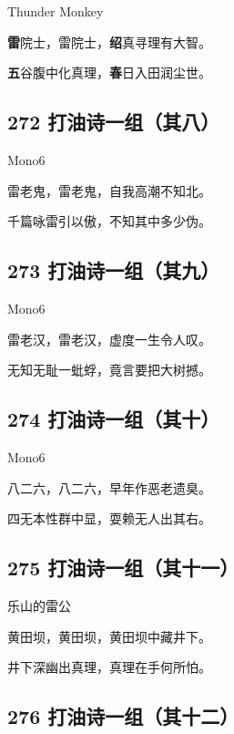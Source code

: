 {Thunder Monkey}

\textbf{雷}院士，雷院士，\textbf{绍}真寻理有大智。

\textbf{五}谷腹中化真理，\textbf{春}日入田润尘世。

\hypertarget{ux6253ux6cb9ux8bd7ux4e00ux7ec4ux5176ux516b}{%
\subsection{272
打油诗一组（其八）}\label{ux6253ux6cb9ux8bd7ux4e00ux7ec4ux5176ux516b}}

{Mono6}

雷老鬼，雷老鬼，自我高潮不知北。

千篇咏雷引以傲，不知其中多少伪。

\hypertarget{ux6253ux6cb9ux8bd7ux4e00ux7ec4ux5176ux4e5d}{%
\subsection{273
打油诗一组（其九）}\label{ux6253ux6cb9ux8bd7ux4e00ux7ec4ux5176ux4e5d}}

{Mono6}

雷老汉，雷老汉，虚度一生令人叹。

无知无耻一蚍蜉，竟言要把大树撼。

\hypertarget{ux6253ux6cb9ux8bd7ux4e00ux7ec4ux5176ux5341}{%
\subsection{274
打油诗一组（其十）}\label{ux6253ux6cb9ux8bd7ux4e00ux7ec4ux5176ux5341}}

{Mono6}

八二六，八二六，早年作恶老遗臭。

四无本性群中显，耍赖无人出其右。

\hypertarget{ux6253ux6cb9ux8bd7ux4e00ux7ec4ux5176ux5341ux4e00}{%
\subsection{275
打油诗一组（其十一）}\label{ux6253ux6cb9ux8bd7ux4e00ux7ec4ux5176ux5341ux4e00}}

{乐山的雷公}

黄田坝，黄田坝，黄田坝中藏井下。

井下深幽出真理，真理在手何所怕。

\hypertarget{ux6253ux6cb9ux8bd7ux4e00ux7ec4ux5176ux5341ux4e8c}{%
\subsection{276
打油诗一组（其十二）}\label{ux6253ux6cb9ux8bd7ux4e00ux7ec4ux5176ux5341ux4e8c}}

